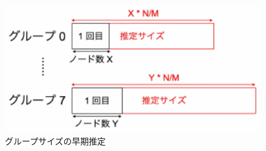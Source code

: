 \begin{figure}[t]
  \centering
  \includegraphics[width=12cm]{./figure/estimated_group_size.pdf}
  \caption{グループサイズの早期推定}
  \label{estimation_size}
\end{figure}
